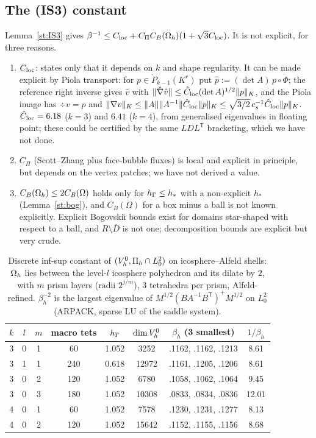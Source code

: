 \subsection{The (IS3) constant}
Lemma~\ref{st:IS3} gives $\beta^{-1}\le C_{\rm loc}+C_\Pi C_B(\Omega_h)(1+\sqrt3C_{\rm loc})$. It is not explicit, for three reasons.
\begin{enumerate}
\item $C_{\rm loc}$: \cite[Theorem~3.1]{GuzmanNeilan2018} states only that it depends on $k$ and shape regularity. It can be made explicit by Piola transport: for $p\in\mathring P_{k-1}(K^r)$ put $\hat p:=(\det A)\,p\circ\Phi$; the reference right inverse gives $\hat v$ with $\lVert \hat\nabla\hat v\rVert\le\hat C_{\rm loc}(\det A)^{1/2}\lVert p\rVert_K$, and the Piola image has $\div v=p$ and $\lVert \nabla v\rVert_K\le\lVert A\rVert\lVert A^{-1}\rVert\hat C_{\rm loc}\lVert p\rVert_K\le\sqrt{3/2}\,c_s^{-1}\hat C_{\rm loc}\lVert p\rVert_K$.  $\hat C_{\rm loc}=6.18$ ($k=3$) and $6.41$ ($k=4$), from generalised eigenvalues in floating point; these could be certified by the same $LDL^{\mathsf T}$ bracketing, which we have not done.
\item $C_\Pi$ (Scott--Zhang plus face-bubble fluxes) is local and explicit in principle, but depends on the vertex patches; we have not derived a value.
\item $C_B(\Omega_h)\le2C_B(\Omega)$ holds only for $h_\Gamma\le h_\ast$ with a non-explicit $h_\ast$ (Lemma~\ref{st:bog}), and $C_B(\Omega)$ for a box minus a ball is not known explicitly. Explicit Bogovski\u{\i} bounds exist for domains star-shaped with respect to a ball, and $R\setminus\overline D$ is not one; decomposition bounds are explicit but very crude.
\end{enumerate}
\begin{table}[ht]
\centering\small
\caption{ Discrete inf-sup constant of $(V_h^0,\Pi_h\cap L^2_0)$ on icosphere--Alfeld shells: $\Omega_h$ lies between the level-$l$ icosphere polyhedron and its dilate by $2$, with $m$ prism layers (radii $2^{j/m}$), $3$ tetrahedra per prism, Alfeld-refined. $\beta_h^{-2}$ is the largest eigenvalue of $M^{1/2}(BA^{-1}B^{\mathsf T})^+M^{1/2}$ on $L^2_0$ (ARPACK, sparse LU of the saddle system).}\label{tab:C2}
\begin{tabular}{cccccccc}
\toprule
$k$ & $l$ & $m$ & macro tets & $h_\Gamma$ & $\dim V_h^0$ & $\beta_h$ (3 smallest) & $1/\beta_h$\\
\midrule
3 & 0 & 1 & 60 & 1.052 & 3252 & .1162, .1162, .1213 & 8.61\\
3 & 1 & 1 & 240 & 0.618 & 12972 & .1161, .1205, .1206 & 8.61\\
3 & 0 & 2 & 120 & 1.052 & 6780 & .1058, .1062, .1064 & 9.45\\
3 & 0 & 3 & 180 & 1.052 & 10308 & .0833, .0834, .0836 & 12.01\\
4 & 0 & 1 & 60 & 1.052 & 7578 & .1230, .1231, .1277 & 8.13\\
4 & 0 & 2 & 120 & 1.052 & 15642 & .1152, .1155, .1156 & 8.68\\
\bottomrule
\end{tabular}
\end{table}
